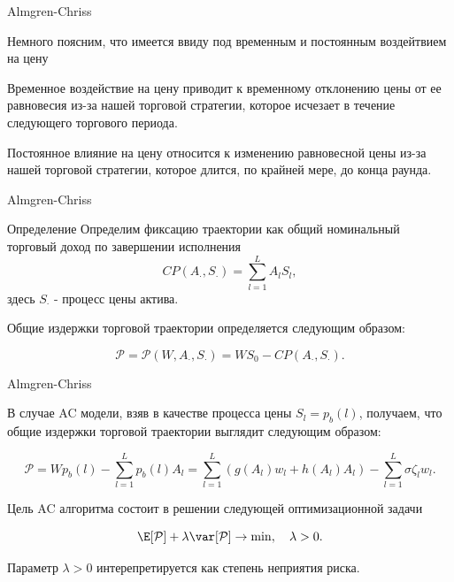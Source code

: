 \documentclass[aspectratio=169]{beamer}
\begin{document}
    \begin{frame}{Almgren-Chriss}

         Немного поясним, что имеется ввиду под временным и постоянным воздейтвием на цену
    
         Временное воздействие на цену приводит к временному отклонению цены от ее равновесия из-за нашей торговой стратегии, которое исчезает в течение следующего торгового периода. 
         
         Постоянное влияние на цену относится к изменению равновесной цены из-за нашей торговой стратегии, которое длится, по крайней мере, до конца раунда. 
    
    \end{frame}

    \begin{frame}{Almgren-Chriss}

        \begin{block}{Определение}
            Определим фиксацию траектории как общий номинальный торговый доход по завершении исполнения  
            \begin{equation*}
                CP( A_{\cdot}, S_{\cdot}) = \sum_{l=1}^L A_{l}S_l,
            \end{equation*}
            здесь $S_{\cdot}$ - процесс цены актива. 

            Общие издержки торговой траектории определяется следующим образом:

            \begin{equation*}
                \mathcal P = \mathcal P(W, A_{\cdot}, S_{\cdot}) = WS_0 - CP(A_{\cdot}, S_{\cdot}).
            \end{equation*}
        \end{block}

    \end{frame}

    \begin{frame}{Almgren-Chriss}

            В случае AC модели, взяв в качестве процесса цены $S_l = p_b(l)$, получаем, что общие издержки торговой траектории выглядит следующим образом:
    
        \begin{equation*}
            \mathcal P = Wp_b(l) - \sum\limits_{l=1}^L p_b(l)A_l = \sum\limits_{l=1}^L ( g(A_l)w_l + h(A_l)A_l) - \sum\limits_{l=1}^L \sigma \zeta_l w_l .
        \end{equation*}

        Цель AC алгоритма состоит в решении следующей оптимизационной задачи 

        \begin{equation*}
            \E [ \mathcal P] + \lambda \var[\mathcal P] \to \min, \quad \lambda > 0.
        \end{equation*}

        Параметр $\lambda >0$ интерепретируется как степень неприятия риска.

    \end{frame}
\end{document}
